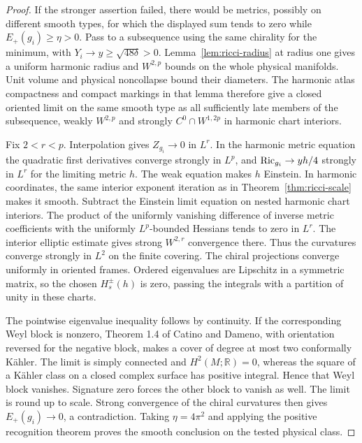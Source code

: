 \begin{proof}
If the stronger assertion failed, there would be metrics, possibly on
different smooth types, for which the displayed sum tends to zero
while \(E_+(g_i)\ge\eta>0\). Pass to a subsequence using the same
chirality for the minimum, with \(Y_i\to y\ge\sqrt{48\delta}>0\).
Lemma~\ref{lem:ricci-radius} at radius one gives a uniform harmonic
radius and \(W^{2,p}\) bounds on the whole physical manifolds.
Unit volume and physical noncollapse bound their diameters.
The harmonic atlas compactness and compact markings in that lemma
therefore give a closed oriented limit on the same smooth type as all
sufficiently late members of the subsequence, weakly \(W^{2,p}\) and
strongly \(C^0\cap W^{1,2p}\) in harmonic chart interiors.

Fix \(2<r<p\). Interpolation gives \(Z_{g_i}\to0\) in \(L^r\).
In the harmonic metric equation the quadratic first derivatives
converge strongly in \(L^p\), and \(\operatorname{Ric}_{g_i}\to yh/4\) strongly in
\(L^r\) for the limiting metric \(h\). The weak equation makes \(h\) Einstein. In harmonic coordinates, the same interior exponent iteration as in Theorem~\ref{thm:ricci-scale} makes it smooth.
Subtract the Einstein limit equation on nested harmonic chart interiors.
The product of the uniformly vanishing difference of inverse metric
coefficients with the uniformly \(L^p\)-bounded Hessians tends to zero
in \(L^r\). The interior elliptic estimate gives strong \(W^{2,r}\)
convergence there. Thus the curvatures converge strongly in \(L^2\)
on the finite covering. The chiral projections converge uniformly in
oriented frames. Ordered eigenvalues are Lipschitz in a symmetric
matrix, so the chosen \(H_s^\pm(h)\) is zero, passing the integrals
with a partition of unity in these charts.

The pointwise eigenvalue inequality follows by continuity. If the
corresponding Weyl block is nonzero, Theorem 1.4 of Catino and Dameno,
with orientation reversed for the negative block, makes a cover of
degree at most two conformally K\"ahler. The limit is simply connected
and \(H^2(M;\mathbb R)=0\), whereas the square of a K\"ahler class on a
closed complex surface has positive integral. Hence that Weyl block
vanishes. Signature zero forces the other block to vanish as well.
The limit is round up to scale. Strong convergence of the chiral
curvatures then gives \(E_+(g_i)\to0\), a contradiction. Taking
\(\eta=4\pi^2\) and applying the positive recognition theorem \cite[Theorems A and B]{ChangGurskyYang2003} proves
the smooth conclusion on the tested physical class.
\end{proof}
